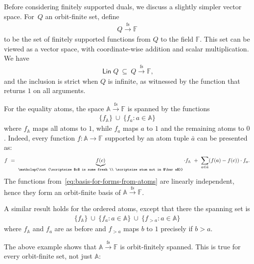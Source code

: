 \documentclass{theoretics}
\newcommand{\set}[1]{\{#1\}}
\newcommand{\myunderbrace}[2]{\underbrace{#1}_{\mathclap{\txt{\scriptsize #2}}}}
\newcommand{\atoms}{\mathbb A}
\DeclareMathOperator{\lin}{\mathsf{Lin}}
\newcommand{\field}{\mathbb F}
\newcommand{\finsup}{\stackrel{\mathrm{fs}}{\to}}
\newcommand{\forms}[1]{#1 \finsup \field}
\begin{document}
Before considering finitely supported duals, we discuss a slightly simpler vector space.
For~$Q$ an orbit-finite set, define 
\begin{align*}
\forms Q
\end{align*}
to be the set of finitely supported functions from $Q$ to the field $\field$. This set can be viewed as a vector space, with coordinate-wise addition and scalar multiplication.  We have
\begin{align*}
\lin Q\   \subseteq \   \forms Q,
\end{align*}
and the inclusion is strict when $Q$ is infinite, as witnessed by the function that returns $1$ on all arguments. 


\begin{example}\label{ex:forms-atoms}
    For the equality atoms,
    the space $\forms \atoms$ is spanned by the functions 
    \begin{align}\label{eq:basis-for-forms-from-atoms}
    \set{f_\atoms} \ \cup \ \set{f_a : a \in \atoms}
    \end{align}
    where $f_\atoms$ maps all atoms to $1$, while $f_a$ maps $a$ to $1$ and the remaining atoms to $0$.
    Indeed, every function $f : \atoms \to \field$ supported by an atom tuple $\bar a$ can be presented as: 
    \begin{align*}
    f \ = \ \myunderbrace{f(c)}{$c$ is some fresh \\ \scriptsize atom not in $\bar a$} \cdot f_\atoms \ + \ \sum_{a \in \bar a} (f(a) - f(c)) \cdot f_a.
    \end{align*}
   The functions from~\eqref{eq:basis-for-forms-from-atoms}  are linearly independent, hence they form an orbit-finite basis of $\forms \atoms$.
    
A similar result holds for the ordered atoms, except that there the spanning set is
  \begin{align*}\label{eq:basis-for-forms-from-atoms-ordered}
    \set{f_\atoms} \ \cup \ \set{f_a : a \in \atoms} \ \cup \ \set{f_{> a} : a \in \atoms}
    \end{align*}
    where $f_\atoms$ and $f_a$ are as before and $f_{>a}$ maps $b$ to $1$ precisely if $b > a$.
\end{example}

The above example shows that $\forms \atoms$ is  orbit-finitely spanned. This is true for every orbit-finite set, not just $\atoms$:
 
\end{document}
